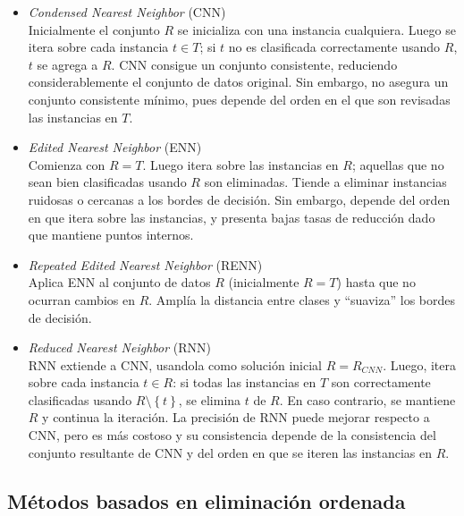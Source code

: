 \begin{itemize}
\item \emph{Condensed Nearest Neighbor} (CNN) \cite{Hart:2006:CNN:2263267.2267647}\\
Inicialmente el conjunto $R$ se inicializa con una instancia cualquiera. Luego se itera sobre cada instancia $t \in T$; si $t$ no es clasificada correctamente usando $R$, $t$ se agrega a $R$.
CNN consigue un conjunto consistente, reduciendo considerablemente el conjunto de datos original. Sin embargo, no asegura un conjunto consistente mínimo, pues depende del orden en el que son revisadas las instancias en $T$.
\item \emph{Edited Nearest Neighbor} (ENN) \cite{wilson1972asymptotic}\\
Comienza con $R = T$. Luego itera sobre las instancias en $R$; aquellas que no sean bien clasificadas usando $R$ son eliminadas. Tiende a eliminar instancias ruidosas o cercanas a los bordes de decisión. Sin embargo, depende del orden en que itera sobre las instancias, y presenta bajas tasas de reducción dado que mantiene puntos internos.
\item \emph{Repeated Edited Nearest Neighbor} (RENN) \cite{wilson1972asymptotic}\\
Aplica ENN al conjunto de datos $R$ (inicialmente $R = T$) hasta que no ocurran cambios en $R$. Amplía la distancia entre clases y ``suaviza'' los bordes de decisión.
\item \emph{Reduced Nearest Neighbor} (RNN) \cite{DBLP:journals/tit/Gates72}\\
RNN extiende a CNN, usandola como solución inicial $R = R_{CNN}$. Luego, itera sobre cada instancia $t \in R$: si todas las instancias en $T$ son correctamente clasificadas usando $R\setminus\left\lbrace t \right\rbrace$, se elimina $t$ de $R$. En caso contrario, se mantiene $R$ y continua la iteración. La precisión de RNN puede mejorar respecto a CNN, pero es más costoso y su consistencia depende de la consistencia del conjunto resultante de CNN y del orden en que se iteren las instancias en $R$.
\end{itemize}

\subsection{Métodos basados en eliminación ordenada}

